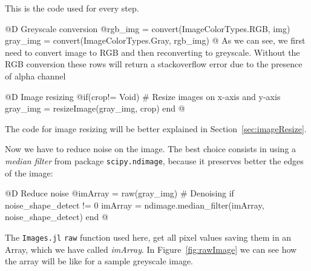 \documentclass[11pt,oneside]{article}	%
\begin{document}
This is the code used for every step.

@D Greyscale conversion
@{rgb_img = convert(Image{ColorTypes.RGB}, img)
gray_img = convert(Image{ColorTypes.Gray}, rgb_img) @}
As we can see, we first need to convert image to RGB and then reconverting to greyscale. Without the RGB conversion these rows will return a stackoverflow error due to the presence of alpha channel

@D Image resizing
@{if(crop!= Void)
  # Resize images on x-axis and y-axis
  gray_img = resizeImage(gray_img, crop)
end @}

The code for image resizing will be better explained in Section~\ref{sec:imageResize}.

Now we have to reduce noise on the image. The best choice consists in using a \textit{median filter} from package \texttt{scipy.ndimage}, because it preserves better the edges of the image:

@D Reduce noise
@{imArray = raw(gray_img)
# Denoising
if noise_shape_detect != 0
  imArray = ndimage.median_filter(imArray, noise_shape_detect)
end @}

The \texttt{Images.jl} \texttt{raw} function used here, get all pixel values saving them in an Array, which we have called \textit{imArray}. In Figure~\ref{fig:rawImage} we can see how the array will be like for a sample greyscale image.
\end{document}

